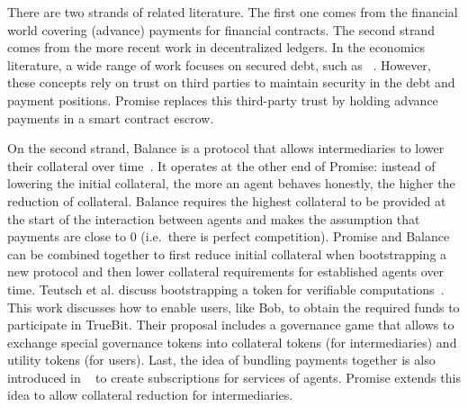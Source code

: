 \documentclass[runningheads]{llncs}
\newcommand{\sys}{Promise\xspace}
\newcommand{\tolgu}[1]{\todo[linecolor=yellow,backgroundcolor=yellow!25,bordercolor=yellow,inline,caption={}]{Todo for Lewis: #1}}
\begin{document}


There are two strands of related literature.
The first one comes from the financial world covering (advance) payments for financial contracts.
The second strand comes from the more recent work in decentralized ledgers.
In the economics literature, a wide range of work focuses on secured debt, such as ~\cite{scott1977bankruptcy,stulz1985analysis}.
However, these concepts rely on trust on third parties to maintain security in the debt and payment positions.
\sys replaces this third-party trust by holding advance payments in a smart contract escrow.

On the second strand, Balance is a protocol that allows intermediaries to lower their collateral over time~\cite{Harz2019Balance}.
It operates at the other end of \sys: instead of lowering the initial collateral, the more an agent behaves honestly, the higher the reduction of collateral.
Balance requires the highest collateral to be provided at the start of the interaction between agents and makes the assumption that payments are close to 0 (i.e.\ there is perfect competition).
\sys and Balance can be combined together to first reduce initial collateral when bootstrapping a new protocol and then lower collateral requirements for established agents over time.
Teutsch et al. discuss bootstrapping a token for verifiable computations~\cite{Teutsch2019Boostrap}.
This work discusses how to enable users, like Bob, to obtain the required funds to participate in TrueBit.
Their proposal includes a governance game that allows to exchange special governance tokens into collateral tokens (for intermediaries) and utility tokens (for users).
Last, the idea of bundling payments together is also introduced in ~\cite{Berg2018} to create subscriptions for services of agents.
\sys extends this idea to allow collateral reduction for intermediaries.
\end{document}
